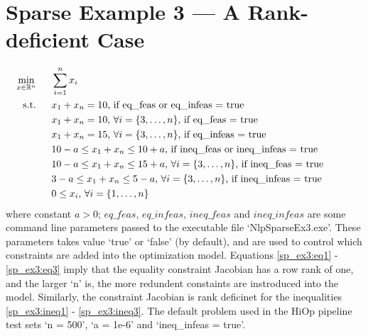 \documentclass[11pt,letterpaper]{article}
\begin{document}
\section{Sparse Example 3 --- A Rank-deficient Case}
\begin{align}
    &&\min_{x\in\mathbb{R}^n}&& & \hspace{0.2cm} \sum_{i=1}^{n} x_i &&&& \label{sp_ex3:obj}\\
    &&\textnormal{s.t.}&& &\hspace{0.2cm}  x_1 + x_n = 10 \textnormal{, if eq\_feas or eq\_infeas = true} &&&&&& \label{sp_ex3:eq1}\\
    &&&&& \hspace{0.2cm}  x_1 + x_n = 10 \textnormal{, }\forall i =\{3,\dots,n\}\textnormal{, if eq\_feas = true} &&&&&& \label{sp_ex2:eq2}\\
    &&&&& \hspace{0.2cm}  x_1 + x_n = 15 \textnormal{, }\forall i =\{3,\dots,n\}\textnormal{, if eq\_infeas = true} &&&&&& \label{sp_ex3:eq3}\\
    &&&&& \hspace{0.2cm}  10-a \leq x_1 + x_n  \leq 10+a \textnormal{, if ineq\_feas or ineq\_infeas = true} &&&&&& \label{sp_ex3:ineq1}\\
    &&&&& \hspace{0.2cm}  10-a \leq x_1 + x_n  \leq 15+a \textnormal{, }\forall i =\{3,\dots,n\}\textnormal{, if ineq\_feas = true} &&&&&& \label{sp_ex3:ineq2}\\
    &&&&& \hspace{0.2cm}  3-a \leq x_1 + x_n  \leq 5-a \textnormal{, }\forall i =\{3,\dots,n\}\textnormal{, if ineq\_infeas = true} &&&&&& \label{sp_ex3:ineq3}\\
    &&&&& \hspace{0.2cm}  0 \leq x_i  \textnormal{, }\forall i =\{1,\dots,n\} &&&&&& \label{sp_ex3:bound}
\end{align}
where constant $a>0$; $eq\_feas$, $eq\_infeas$, $ineq\_feas$ and $ineq\_infeas$ are some command line parameters passed to the executable file `NlpSparseEx3.exe'. These parameters takes value `true' or `false' (by default), and are used to control which constraints are added into the optimization model. Equations \eqref{sp_ex3:eq1} - \eqref{sp_ex3:eq3} imply that the equality constraint Jacobian has a row rank of one, and the larger `n' is, the more redundent constaints are instroduced into the model. Similarly, the constraint Jacobian is rank deficinet for the inequalities \eqref{sp_ex3:ineq1} - \eqref{sp_ex3:ineq3}. 
The default problem used in the HiOp pipeline test sets `n = 500', `a = 1e-6' and `ineq\_infeas = true'.
\end{document}
